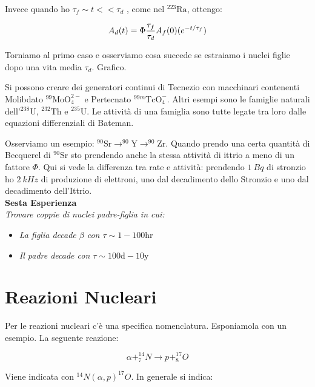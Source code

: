 \documentclass [a4paper, twoside] {book}
\begin{document}
Invece quando ho $\tau_f \sim t << \tau_d$ , come nel $^{223}\text{Ra}$, ottengo:

\begin{equation}
A_d(t)=\Phi \frac{\tau_f}{\tau_d}A_f(0)(\-e^{-t/\tau_f})
\end{equation}

Torniamo al primo caso e osserviamo cosa succede se estraiamo i nuclei figlie dopo una vita media $\tau_d$. Grafico.

Si possono creare dei generatori continui di Tecnezio con macchinari contenenti Molibdato $^{99}\text{MoO}_4^{2-}$ e Pertecnato $^{99m}\text{TcO}_4^-$.
Altri esempi sono le famiglie naturali dell'$^{238}\text{U}$, $^{232}\text{Th}$ e $^{235}\text{U}$.  Le attività di una famiglia sono tutte legate tra loro dalle equazioni differenziali di Bateman.

Osserviamo un esempio: $^{90}\text{Sr} \rightarrow ^{90}\text{Y} \rightarrow ^{90}\text{Zr}$. Quando prendo una certa quantità di Becquerel di $^{90}\text{Sr}$ sto prendendo anche la stessa attività di ittrio a meno di un fattore $\Phi$. Qui si vede la differenza tra rate e attività: prendendo $1 \ Bq$ di stronzio ho $2 \ kHz$ di produzione di elettroni, uno dal decadimento dello Stronzio e uno dal decadimento dell'Ittrio. \\

\textbf{Sesta Esperienza}\\

\emph{Trovare coppie di nuclei padre-figlia in cui:}
\begin{itemize}
\item \emph{La figlia decade $\beta$ con $\tau\sim1-100\text{hr}$}
\item \emph{Il padre decade con $\tau\sim100\text{d}-10\text{y}$}
\end{itemize}

\chapter{Reazioni Nucleari}

Per le reazioni nucleari c'è una specifica nomenclatura. Esponiamola con un esempio. La seguente reazione:

\begin{equation}
\alpha+^{14}_7N \longrightarrow p+^{17}_8O
\end{equation}

Viene indicata con $^{14}N(\alpha,p)^{17}O$. In generale si indica:
\end{document}
